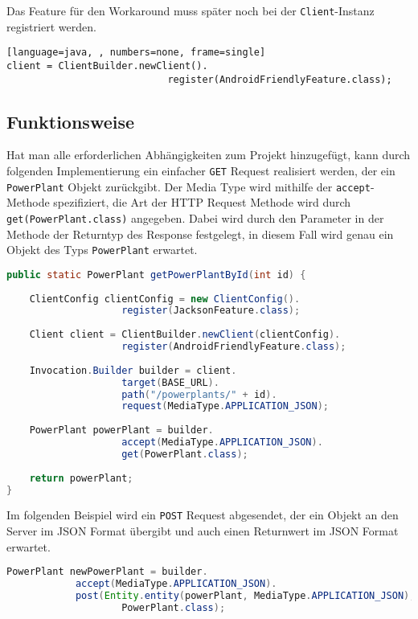 Das Feature für den Workaround muss später noch bei der \texttt{Client}-Instanz registriert werden.

\begin{lstlisting}[language=java, , numbers=none, frame=single]
client = ClientBuilder.newClient().
							register(AndroidFriendlyFeature.class);
\end{lstlisting}


\subsection{Funktionsweise}
Hat man alle erforderlichen Abhängigkeiten zum Projekt hinzugefügt, kann durch folgenden Implementierung ein einfacher \texttt{GET} Request realisiert werden, der ein \texttt{PowerPlant} Objekt zurückgibt. Der Media Type wird mithilfe der \texttt{accept}-Methode spezifiziert, die Art der HTTP Request Methode wird durch \texttt{get(PowerPlant.class)} angegeben. Dabei wird durch den Parameter in der Methode der Returntyp des Response festgelegt, in diesem Fall wird genau ein Objekt des Typs \texttt{PowerPlant} erwartet. 

\begin{lstlisting}[language=java, caption={GET Request},label={lst:jerseyGET}, escapechar=|, frame=single]
public static PowerPlant getPowerPlantById(int id) {
	
	ClientConfig clientConfig = new ClientConfig().
					register(JacksonFeature.class);
	
	Client client = ClientBuilder.newClient(clientConfig).
					register(AndroidFriendlyFeature.class);
	
	Invocation.Builder builder = client.
					target(BASE_URL).
					path("/powerplants/" + id).
					request(MediaType.APPLICATION_JSON);
	
	PowerPlant powerPlant = builder.
					accept(MediaType.APPLICATION_JSON).
					get(PowerPlant.class);
	
	return powerPlant;
}
\end{lstlisting}

Im folgenden Beispiel wird ein \texttt{POST} Request abgesendet, der ein Objekt an den Server im JSON Format übergibt und auch einen Returnwert im JSON Format erwartet. 
\begin{lstlisting}[language=java, label={lst:jerseyPOST}, escapechar=|,numbers=none, frame=single]
PowerPlant newPowerPlant = builder.
			accept(MediaType.APPLICATION_JSON).
			post(Entity.entity(powerPlant, MediaType.APPLICATION_JSON), 
					PowerPlant.class);

\end{lstlisting}


